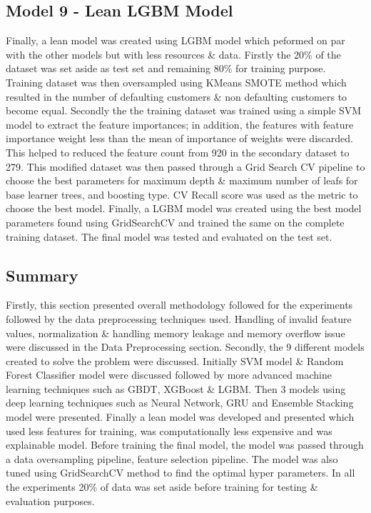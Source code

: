 \documentclass[twoside,11pt,a4paper]{article}
\begin{document}
\subsection{Model 9 - Lean \acs{LGBM} Model}
Finally, a lean model was created using \acs{LGBM} model which peformed on par with the other models but with less resources \& data. Firstly the 20\% of the dataset was set aside as test set and remaining 80\% for training purpose. Training dataset was then oversampled using KMeans \acs{SMOTE} method which resulted in the number of defaulting customers \& non defaulting customers to become equal. Secondly the the training dataset was trained using a simple \acs{SVM} model to extract the feature importances; in addition, the features with feature importance weight less than the mean of importance of weights were discarded. This helped to reduced the feature count from 920 in the secondary dataset to 279. This modified dataset was then passed through a Grid Search CV pipeline to choose the best parameters for maximum depth \& maximum number of leafs for base learner trees, and boosting type. \acf{CV} Recall score was used as the metric to choose the best model. Finally, a \acs{LGBM} model was created using the best model parameters found using GridSearchCV and trained the same on the complete training dataset. The final model was tested and evaluated on the test set.

\subsection{Summary}
Firstly, this section presented overall methodology followed for the experiments followed by the data preprocessing techniques used. Handling of invalid feature values, normalization \& handling memory leakage and memory overflow issue were discussed in the Data Preprocessing section. Secondly, the 9 different models created to solve the problem were discussed. Initially \acs{SVM} model \& Random Forest Classifier model were discussed followed by more advanced machine learning techniques such as \acs{GBDT}, \acs{XGBoost} \& \acs{LGBM}. Then 3 models using deep learning techniques such as Neural Network, \acs{GRU}  and Ensemble Stacking model were presented. Finally a lean model was developed and presented which used less features for training, was computationally less expensive and was explainable model. Before training the final model, the model was passed through a data oversampling pipeline, feature selection pipeline. The model was also tuned using GridSearchCV method to find the optimal hyper parameters. In all the experiments 20\% of data was set aside before training for testing \& evaluation purposes.
\end{document}

